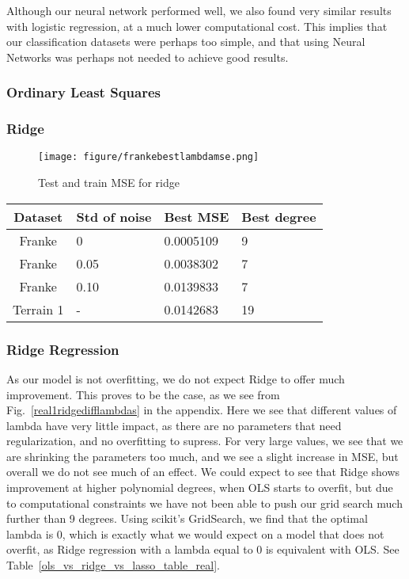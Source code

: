 \documentclass[onecolumn,10pt,cleanfoot]{asme2ej}
\begin{document}
Although our neural network performed well, we also found very similar results with logistic regression, at a much lower computational cost. This implies that our classification datasets were perhaps too simple, and that using Neural Networks was perhaps not needed to achieve good results.

\subsubsection{Ordinary Least Squares}

\subsubsection{Ridge}

\begin{figure}[h]
\centerline{\texttt{[image: figure/frankebestlambdamse.png]}}
\caption{Test and train MSE for ridge}
\label{frankebestlambdamse}
\end{figure}


\begin{table}
\begin{center}
\label{ols_mse_table_dif_data}
\begin{tabular}{c l l l}
Dataset & Std of noise & Best MSE & Best degree \\
\hline
Franke & 0 & 0.0005109 & 9\\
Franke & 0.05 & 0.0038302 & 7 \\
Franke & 0.10 & 0.0139833 & 7 \\
Terrain 1 & - & 0.0142683 & 19 \\
\hline
\end{tabular}
\end{center}
\end{table}

\subsubsection{Ridge Regression}

As our model is not overfitting, we do not expect Ridge to offer much improvement. This proves to be the case, as we see from Fig.~\ref{real1ridgedifflambdas} in the appendix. Here we see that different values of lambda have very little impact, as there are no parameters that need regularization, and no overfitting to supress. For very large values, we see that we are shrinking the parameters too much, and we see a slight increase in MSE, but overall we do not see much of an effect. We could expect to see that Ridge shows improvement at higher polynomial degrees, when OLS starts to overfit, but due to computational constraints we have not been able to push our grid search much further than 9 degrees. Using scikit's GridSearch, we find that the optimal lambda is 0, which is exactly what we would expect on a model that does not overfit, as Ridge regression with a lambda equal to 0 is equivalent with OLS. See Table~\ref{ols_vs_ridge_vs_lasso_table_real}.
\end{document}

